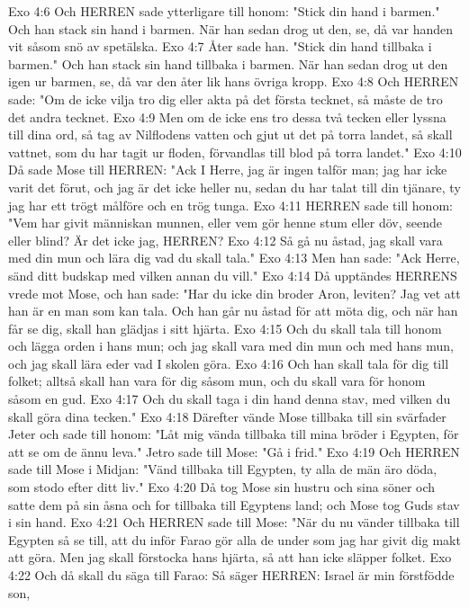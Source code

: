 Exo 4:6  Och HERREN sade ytterligare till honom: "Stick din hand i barmen." Och han stack sin hand i barmen. När han sedan drog ut den, se, då var handen vit såsom snö av spetälska.
Exo 4:7  Åter sade han. "Stick din hand tillbaka i barmen." Och han stack sin hand tillbaka i barmen. När han sedan drog ut den igen ur barmen, se, då var den åter lik hans övriga kropp.
Exo 4:8  Och HERREN sade: "Om de icke vilja tro dig eller akta på det första tecknet, så måste de tro det andra tecknet.
Exo 4:9  Men om de icke ens tro dessa två tecken eller lyssna till dina ord, så tag av Nilflodens vatten och gjut ut det på torra landet, så skall vattnet, som du har tagit ur floden, förvandlas till blod på torra landet."
Exo 4:10  Då sade Mose till HERREN: "Ack I Herre, jag är ingen talför man; jag har icke varit det förut, och jag är det icke heller nu, sedan du har talat till din tjänare, ty jag har ett trögt målföre och en trög tunga.
Exo 4:11  HERREN sade till honom: "Vem har givit människan munnen, eller vem gör henne stum eller döv, seende eller blind? Är det icke jag, HERREN?
Exo 4:12  Så gå nu åstad, jag skall vara med din mun och lära dig vad du skall tala."
Exo 4:13  Men han sade: "Ack Herre, sänd ditt budskap med vilken annan du vill."
Exo 4:14  Då upptändes HERRENS vrede mot Mose, och han sade: "Har du icke din broder Aron, leviten? Jag vet att han är en man som kan tala. Och han går nu åstad för att möta dig, och när han får se dig, skall han glädjas i sitt hjärta.
Exo 4:15  Och du skall tala till honom och lägga orden i hans mun; och jag skall vara med din mun och med hans mun, och jag skall lära eder vad I skolen göra.
Exo 4:16  Och han skall tala för dig till folket; alltså skall han vara för dig såsom mun, och du skall vara för honom såsom en gud.
Exo 4:17  Och du skall taga i din hand denna stav, med vilken du skall göra dina tecken."
Exo 4:18  Därefter vände Mose tillbaka till sin svärfader Jeter och sade till honom: "Låt mig vända tillbaka till mina bröder i Egypten, för att se om de ännu leva." Jetro sade till Mose: "Gå i frid."
Exo 4:19  Och HERREN sade till Mose i Midjan: "Vänd tillbaka till Egypten, ty alla de män äro döda, som stodo efter ditt liv."
Exo 4:20  Då tog Mose sin hustru och sina söner och satte dem på sin åsna och for tillbaka till Egyptens land; och Mose tog Guds stav i sin hand.
Exo 4:21  Och HERREN sade till Mose: "När du nu vänder tillbaka till Egypten så se till, att du inför Farao gör alla de under som jag har givit dig makt att göra. Men jag skall förstocka hans hjärta, så att han icke släpper folket.
Exo 4:22  Och då skall du säga till Farao: Så säger HERREN: Israel är min förstfödde son,
